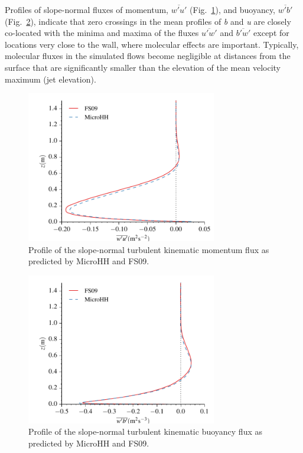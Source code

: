\documentclass[gmd]{copernicus}
\begin{document}
Profiles of slope-normal fluxes of momentum, $\overline{w'u'}$ (Fig.~\ref{katabatic_wu}), and buoyancy, $\overline{w'b'}$ (Fig.~\ref{katabatic_wb}), indicate that zero crossings in the mean profiles of \textit{b} and \textit{u} are closely co-located with the minima and maxima of the fluxes $\overline{u'w'}$ and $\overline{b'w'}$ except for locations very close to the wall, where molecular effects are important. Typically, molecular fluxes in the simulated flows become negligible at distances from the surface that are significantly smaller than the elevation of the mean velocity maximum (jet elevation).

\begin{figure}
	\centerline{\includegraphics[width=8.3cm]{figs/katabatic_wu.pdf}}
	\caption{Profile of the slope-normal turbulent kinematic momentum flux as predicted by MicroHH and FS09.}
	\label{katabatic_wu}
\end{figure}

\begin{figure}
	\centerline{\includegraphics[width=8.3cm]{figs/katabatic_wb.pdf}}
	\caption{Profile of the slope-normal turbulent kinematic buoyancy flux as predicted by MicroHH and FS09.}
	\label{katabatic_wb}
\end{figure}
\end{document}
